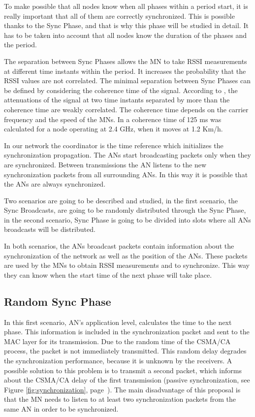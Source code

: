 To make possible that all nodes know when all phases within a period start, it is really important that all of them are correctly synchronized. This is 
possible thanks to the Sync Phase, and that is why this phase will be studied in detail. It has to be taken into account that all nodes know the duration
of the phases and the period.

The separation between Sync Phases allows the \ac{MN} to take \ac{RSSI} measurements at different time instants within the period. It increases the 
probability that the \ac{RSSI} values are not correlated. The minimal separation between Sync Phases can be defined by considering the coherence time 
of the signal.  According to \cite{RSSIcorrelated}, the attenuations of the signal at two time instants separated by more than the coherence time 
are weakly correlated. The coherence time depends on the carrier frequency and the speed of the \acp{MN}. In \cite{RSSIcorrelated2} a coherence time 
of 125 ms was calculated for a node operating at 2.4 GHz, when it moves at 1.2 Km/h.

In our network the coordinator is the time reference which initializes the synchronization propagation. The \acp{AN} start broadcasting packets only 
when they are synchronized. Between transmissions the \ac{AN} listens to the new synchronization packets from all surrounding \acp{AN}. In this way 
it is possible that the \acp{AN} are always synchronized.

Two scenarios are going to be described and studied, in the first scenario, the Sync Broadcasts, are going to be randomly distributed through the Sync 
Phase, in the second scenario, Sync Phase is going to be divided into slots where all \acp{AN} broadcasts will be distributed.

In both scenarios, the \acp{AN} broadcast packets contain information about the synchronization of the network as well as the position 
of the \acp{AN}. These packets are used by the \acp{MN} to obtain \ac{RSSI} measurements and to synchronize. This way they can know when the start time of 
the next phase will take place.

\subsection{Random Sync Phase}

In this first scenario, \ac{AN}'s application level, calculates the time to the next phase. This information is included in the synchronization packet 
and sent to the \ac{MAC} layer for its transmission. Due to the random time of the \ac{CSMA/CA} process, the packet is not immediately transmitted. This 
random delay degrades the synchronization performance, because it is unknown by the receivers. A possible solution to this problem is to transmit a 
second packet, which informs about the \ac{CSMA/CA} delay of the first transmission (passive synchronization, see Figure \ref{fig:synchronization}, 
page~\pageref{fig:synchronization}). The main disadvantage of this proposal is that the \ac{MN} needs to listen to at least two synchronization packets 
from the same \ac{AN} in order to be synchronized.

